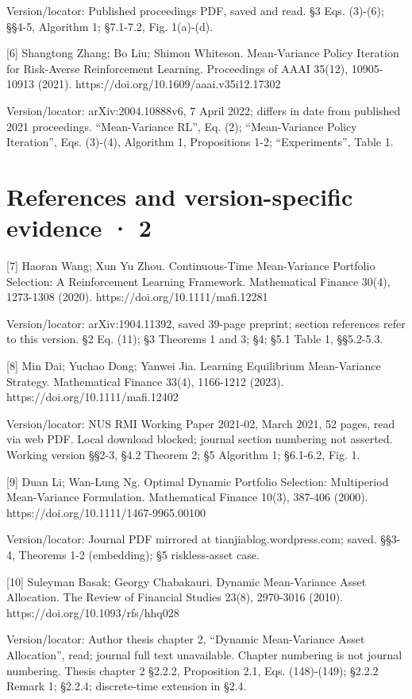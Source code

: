 \documentclass[10pt,a4paper]{article}
\begin{document}
Version/locator: Published proceedings PDF, saved and read. §3 Eqs. (3)-(6); §§4-5, Algorithm 1; §7.1-7.2, Fig. 1(a)-(d).

[6] Shangtong Zhang; Bo Liu; Shimon Whiteson. Mean-Variance Policy Iteration for Risk-Averse Reinforcement Learning. Proceedings of AAAI 35(12), 10905-10913 (2021). https://doi.org/10.1609/aaai.v35i12.17302

Version/locator: arXiv:2004.10888v6, 7 April 2022; differs in date from published 2021 proceedings. “Mean-Variance RL”, Eq. (2); “Mean-Variance Policy Iteration”, Eqs. (3)-(4), Algorithm 1, Propositions 1-2; “Experiments”, Table 1.

\clearpage
\section*{References and version-specific evidence · 2}
[7] Haoran Wang; Xun Yu Zhou. Continuous-Time Mean-Variance Portfolio Selection: A Reinforcement Learning Framework. Mathematical Finance 30(4), 1273-1308 (2020). https://doi.org/10.1111/mafi.12281

Version/locator: arXiv:1904.11392, saved 39-page preprint; section references refer to this version. §2 Eq. (11); §3 Theorems 1 and 3; §4; §5.1 Table 1, §§5.2-5.3.

[8] Min Dai; Yuchao Dong; Yanwei Jia. Learning Equilibrium Mean-Variance Strategy. Mathematical Finance 33(4), 1166-1212 (2023). https://doi.org/10.1111/mafi.12402

Version/locator: NUS RMI Working Paper 2021-02, March 2021, 52 pages, read via web PDF. Local download blocked; journal section numbering not asserted. Working version §§2-3, §4.2 Theorem 2; §5 Algorithm 1; §6.1-6.2, Fig. 1.

[9] Duan Li; Wan-Lung Ng. Optimal Dynamic Portfolio Selection: Multiperiod Mean-Variance Formulation. Mathematical Finance 10(3), 387-406 (2000). https://doi.org/10.1111/1467-9965.00100

Version/locator: Journal PDF mirrored at tianjiablog.wordpress.com; saved. §§3-4, Theorems 1-2 (embedding); §5 riskless-asset case.

[10] Suleyman Basak; Georgy Chabakauri. Dynamic Mean-Variance Asset Allocation. The Review of Financial Studies 23(8), 2970-3016 (2010). https://doi.org/10.1093/rfs/hhq028

Version/locator: Author thesis chapter 2, “Dynamic Mean-Variance Asset Allocation”, read; journal full text unavailable. Chapter numbering is not journal numbering. Thesis chapter 2 §2.2.2, Proposition 2.1, Eqs. (148)-(149); §2.2.2 Remark 1; §2.2.4; discrete-time extension in §2.4.
\end{document}
